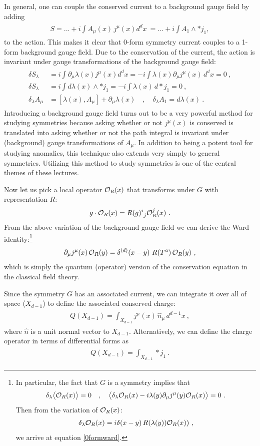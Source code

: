 \documentclass[11pt]{article}
\newcommand{\eq}[1]{\begin{align}\begin{split}#1\end{split}\end{align}}
\def\be{ \begin{equation} }
\def\ee{ \end{equation}}
\def\CO {{\cal O}}
\def\CO {{\cal O}}
\begin{document}
In general, one  can couple the conserved current to a background gauge field by adding 
\eq{
S=...+i \int A_\mu(x) \,j^\mu(x)d^dx~ = \dots + i \int A_1 \wedge \ast  j_1,
}
to the action. This makes it clear that 0-form symmetry current couples to a 1-form background gauge field. Due to the conservation of the current, the action is invariant under gauge transformations of the background gauge field:
\eq{
\delta S_\lambda &=i\int \partial_\mu \lambda(x) j^\mu (x) d^d x=-i\int \lambda(x) \partial_\mu j^\mu(x)\, d^dx=0~,\\
\delta S_\lambda & =i \int d\lambda(x) \wedge \ast j_1=-i \int \lambda(x)\, d\ast j_1=0~,\\
\delta_\lambda A_\mu&=[\lambda(x),A_\mu]+\partial_\mu \lambda(x)\quad, \quad \delta_\lambda A_1=d\lambda(x)~.
}
Introducing a background gauge field turns out to be a very powerful method for studying symmetries because asking whether or not $j^\mu(x)$ is conserved is translated  into asking whether or not the path integral is invariant under (background) gauge transformations of $A_\mu$.  
In addition to being a potent tool for studying anomalies, this technique also extends very simply to  general symmetries. Utilizing this method to study symmetries is one of the central themes of these lectures. 

Now let us pick a local operator  $\CO_R(x)$ that transforms under $G$ with representation $R$:
\eq{
g\cdot \CO_R(x)=R(g)^i_{~j}\CO_R^j(x)~.
} 
From the above variation of the background gauge field we can derive the Ward identity:\footnote{
In particular, the fact that $G$ is a symmetry implies that 
\eq{
\delta_\lambda\big\langle \CO_R(x)\big\rangle=0\quad, \quad \big\langle \delta_{\lambda} \CO_R(x)-i\lambda(y) \partial_\mu j^\mu(y) \CO_R(x)\big\rangle=0~.
}
Then from the variation of $\CO_R(x)$:
\eq{
\delta_{\lambda}\CO_R(x)=i\delta(x-y)\,R(\lambda(y)) \CO_R(x))~,
}
we arrive at equation \eqref{0formward}. 
}
\be\label{0formward}
\partial_\mu j^\mu(x) \,\CO_R(y)=\delta^{(d)}(x-y)\,\, R(T^a)\, \CO_R(y)~,
\ee
which is simply the quantum (operator) version of the conservation equation in the classical field theory. 




Since the symmetry $G$ has an associated current, we can integrate it over all of space ($X_{d-1}$) to define the associated conserved charge:
\eq{
Q(X_{d-1})=\int_{X_{d-1}} j^\mu(x)\,\hat{n}_\mu\, d^{d-1}x~,
}
where $\hat{n}$ is a unit normal vector to $X_{d-1}$. Alternatively, we can define the charge operator in terms of differential forms as
\eq{
Q(X_{d-1})=\int_{X_{d-1}}\ast j_1~. 
}
\end{document}
